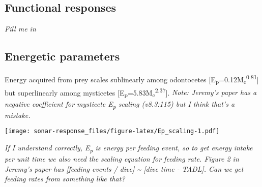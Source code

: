 \documentclass[]{article}
\begin{document}
\subsection{Functional responses}\label{functional-responses}

\emph{Fill me in}

\subsection{Energetic parameters}\label{energetic-parameters}

Energy acquired from prey scales sublinearly among odontocetes
{[}E\textsubscript{p}=0.12M\textsubscript{c}\textsuperscript{0.81}{]}
but superlinearly among mysticetes
{[}E\textsubscript{p}=5.83M\textsubscript{c}\textsuperscript{2.37}{]}.
\emph{Note: Jeremy's paper has a negative coefficient for mysticete
E\textsubscript{p} scaling (v8.3:115) but I think that's a mistake.}

\texttt{[image: sonar-response\_files/figure-latex/Ep\_scaling-1.pdf]}

\emph{If I understand correctly, E\textsubscript{p} is energy per
feeding event, so to get energy intake per unit time we also need the
scaling equation for feeding rate. Figure 2 in Jeremy's paper has
{[}feeding events / dive{]} \textasciitilde{} {[}dive time - TADL{]}.
Can we get feeding rates from something like that?}
\end{document}
